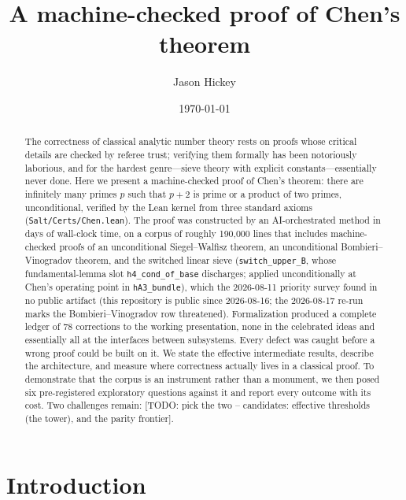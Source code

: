\documentclass[11pt]{amsart}
\title{A machine-checked proof of Chen's theorem}
\author{Jason Hickey}
\date{\today}
\theoremstyle{remark}
\begin{document}
\begin{abstract}
The correctness of classical analytic number theory rests on proofs whose
critical details are checked by referee trust; verifying them formally has
been notoriously laborious, and for the hardest genre---sieve theory with
explicit constants---essentially never done. Here we present a
machine-checked proof of Chen's theorem: there are infinitely many primes
$p$ such that $p+2$ is prime or a product of two primes, unconditional,
verified by the Lean kernel from three standard axioms
(\texttt{Salt/Certs/Chen.lean}). The proof was
constructed by an AI-orchestrated method in days of wall-clock time, on a
corpus of roughly 190{,}000 lines that includes machine-checked proofs of
an unconditional Siegel--Walfisz theorem, an unconditional
Bombieri--Vinogradov theorem, and the switched linear sieve (\texttt{switch\_upper\_B}, whose fundamental-lemma slot \texttt{h4\_cond\_of\_base} discharges; applied unconditionally at Chen's operating point in \texttt{hA3\_bundle}), which the
2026-08-11 priority survey found in no public artifact (this repository is
public since 2026-08-16; the 2026-08-17 re-run marks the
Bombieri--Vinogradov row threatened). Formalization produced a complete ledger of
78 corrections to the working presentation, none in the celebrated ideas
and essentially all at the interfaces between subsystems. Every defect was
caught before a wrong proof could be built on it. We state the effective
intermediate results, describe the architecture, and measure where
correctness actually lives in a classical proof. To demonstrate that the
corpus is an instrument rather than a monument, we then posed six
pre-registered exploratory questions against it and report every outcome
with its cost. Two challenges remain:
[TODO: pick the two -- candidates: effective thresholds (the tower), and
the parity frontier].
\end{abstract}

\maketitle

\section{Introduction}
\end{document}
